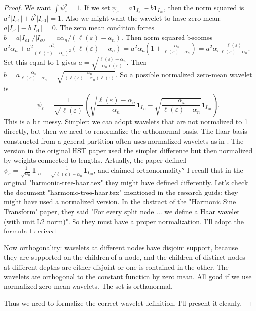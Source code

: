 \documentclass[11pt,a4paper]{article}
\begin{document}
\begin{proof}
We want \(\int \psi_\varepsilon^2 = 1\). If we set \(\psi_\varepsilon = a \mathbf{1}_{I_{\varepsilon1}} - b \mathbf{1}_{I_{\varepsilon0}}\), then the norm squared is \(a^2 |I_{\varepsilon1}| + b^2 |I_{\varepsilon0}| = 1\). Also we might want the wavelet to have zero mean: \(a|I_{\varepsilon1}| - b|I_{\varepsilon0}| = 0\). The zero mean condition forces \(b = a |I_{\varepsilon1}| / |I_{\varepsilon0}| = a \alpha_n/(\ell(\varepsilon)-\alpha_n)\). Then norm squared becomes \(a^2 \alpha_n + a^2 \frac{\alpha_n^2}{(\ell(\varepsilon)-\alpha_n)^2} (\ell(\varepsilon)-\alpha_n) = a^2 \alpha_n (1 + \frac{\alpha_n}{\ell(\varepsilon)-\alpha_n}) = a^2 \alpha_n \frac{\ell(\varepsilon)}{\ell(\varepsilon)-\alpha_n}\). Set this equal to 1 gives \(a = \sqrt{ \frac{\ell(\varepsilon)-\alpha_n}{\alpha_n \ell(\varepsilon)} }\). Then \(b = a \frac{\alpha_n}{\ell(\varepsilon)-\alpha_n} = \sqrt{ \frac{\alpha_n}{(\ell(\varepsilon)-\alpha_n) \ell(\varepsilon)} }\). So a possible normalized zero‑mean wavelet is
\[
\psi_\varepsilon = \frac{1}{\sqrt{\ell(\varepsilon)}} \left( \sqrt{ \frac{\ell(\varepsilon)-\alpha_n}{\alpha_n} } \mathbf{1}_{I_{\varepsilon1}} - \sqrt{ \frac{\alpha_n}{\ell(\varepsilon)-\alpha_n} } \mathbf{1}_{I_{\varepsilon0}} \right).
\]
This is a bit messy. Simpler: we can adopt wavelets that are not normalized to 1 directly, but then we need to renormalize the orthonormal basis. The Haar basis constructed from a general partition often uses normalized wavelets as in \cite{wavelets}. The version in the original HST paper used the simpler difference but then normalized by weights connected to lengths. Actually, the paper defined \(\psi_\varepsilon = \frac{1}{\sqrt{\alpha_n}}\mathbf{1}_{I_{\varepsilon1}} - \frac{1}{\sqrt{\ell(\varepsilon)-\alpha_n}}\mathbf{1}_{I_{\varepsilon0}}\), and claimed orthonormality? I recall that in the original "harmonic-tree-haar.tex" they might have defined differently. Let's check the document "harmonic-tree-haar.tex" mentioned in the research guide: they might have used a normalized version. In the abstract of the "Harmonic Sine Transform" paper, they said "For every split node ... we define a Haar wavelet (with unit L2 norm)". So they must have a proper normalization. I'll adopt the formula I derived.

Now orthogonality: wavelets at different nodes have disjoint support, because they are supported on the children of a node, and the children of distinct nodes at different depths are either disjoint or one is contained in the other. The wavelets are orthogonal to the constant function by zero mean. All good if we use normalized zero-mean wavelets. The set is orthonormal.

Thus we need to formalize the correct wavelet definition. I'll present it cleanly.

\end{proof}
\end{document}
